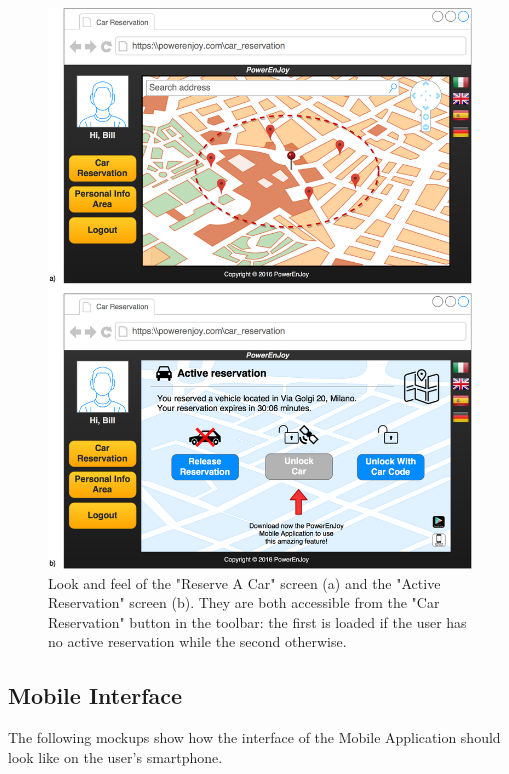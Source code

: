 \begin{figure}[H]
\centering
		\includegraphics[width=\textwidth]{./user_interface_design/diagrams/web_car_reservation.png}
		\caption{Look and feel of the "Reserve A Car" screen (a) and the "Active Reservation" screen (b). They are both accessible from the "Car Reservation" button in the toolbar: the first is loaded if the user has no active reservation while the second otherwise.}
		\label{web_car_resrvation}
\end{figure}

\subsection{Mobile Interface}
The following mockups show how the interface of the Mobile Application should look like on the user's smartphone.

